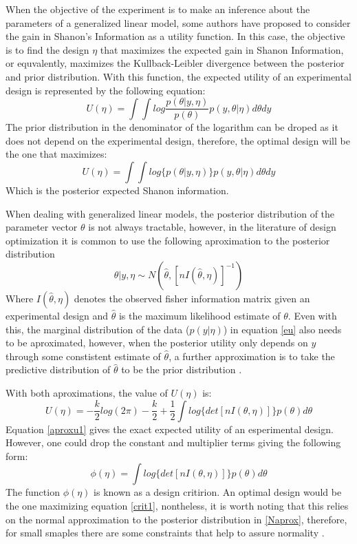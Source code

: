 \documentclass[preprint,review,12pt]{elsarticle}
\begin{document}
When the objective of the experiment is to make an inference about the parameters of a generalized linear model, some authors \citep[e.g.][]{Ber1979} have proposed to consider the gain in Shanon's Information as a utility function. In this case, the objective is to find the design $\eta$ that maximizes the expected gain in Shanon Information, or equvalently, maximizes the Kullback-Leibler divergence between the posterior and prior distribution. With this function, the expected utility of an experimental design is represented by the following equation:
\begin{equation}
U(\eta)=\int \int log\frac{p(\theta|y,\eta)}{p(\theta)} p(y,\theta |\eta) d\theta dy
\label{klu}
\end{equation}
The prior distribution in the denominator of the logarithm can be droped as it does not depend on the experimental design, therefore, the optimal design will be the one that maximizes:
\begin{equation}
U(\eta)=\int \int log \{p(\theta|y,\eta)\} p(y,\theta |\eta) d\theta dy
\label{egShanon}
\end{equation}
Which is the posterior expected Shanon information.

When dealing with generalized linear models, the posterior distribution of the parameter vector $\theta$ is not always tractable, however, in the literature of design optimization it is common to use the following aproximation to the posterior distribution
\begin{equation}
\theta|y,\eta \sim N\left(\hat{\theta},[nI(\hat{\theta},\eta)]^{-1}\right)
\label{Naprox}
\end{equation}
Where $I(\hat{\theta},\eta)$ denotes the observed fisher information matrix given an experimental design and $\hat{\theta}$ is the maximum likelihood estimate of $\theta$. Even with this, the marginal distribution of the data ($p(y|\eta)$) in equation \ref{eu} also needs to be aproximated, however, when the posterior utility only depends on $y$ through some constistent estimate of $\hat{\theta}$, a further approximation is to take the predictive distribution of  $\hat{\theta}$ to be the prior distribution \cite{chalar1989}.

With both aproximations, the value of $U(\eta)$ is:
\begin{equation}
U(\eta)=-\frac{k}{2}log(2\pi)-\frac{k}{2}+\frac{1}{2} \int log \{det[nI(\theta,\eta)]\} p(\theta) d\theta
\label{aproxu1}
\end{equation}
Equation \ref{aproxu1} gives the exact expected utility of an esperimental design. However, one could drop the constant and multiplier terms giving the following form:
\begin{equation}
\phi(\eta)= \int log \{det[nI(\theta,\eta)]\} p(\theta) d\theta
\label{crit1}
\end{equation}
The function $\phi(\eta)$ is known as a design critirion. An optimal design would be the one maximizing equation \ref{crit1}, nontheless, it is worth noting that this relies on the normal approximation to the posterior distribution in \ref{Naprox}, therefore, for small smaples there are some constraints that help to assure normality \citep[see][]{CLCH2002}.
\end{document}
